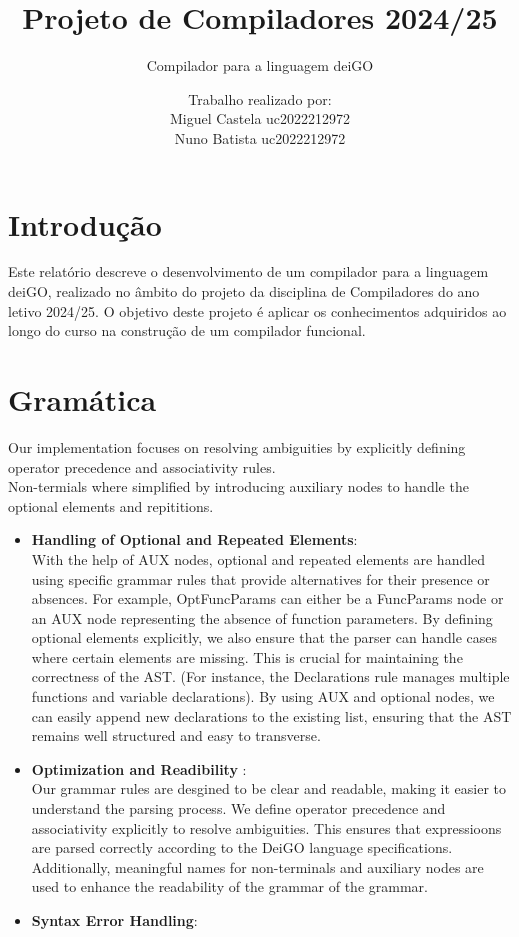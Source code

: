 \documentclass[12pt]{article}
\title{Projeto de Compiladores 2024/25}
\subtitle{Compilador para a linguagem deiGO}
\author{Trabalho realizado por:\\
Miguel Castela uc2022212972 \\
Nuno Batista uc2022212972}
\date{}
\begin{document}
\maketitle

\newpage

\section{Introdução}
Este relatório descreve o desenvolvimento de um compilador para a linguagem deiGO, realizado no âmbito do projeto da disciplina de Compiladores do ano letivo 2024/25. O objetivo deste projeto é aplicar os conhecimentos adquiridos ao longo do curso na construção de um compilador funcional.

\section{Gramática}
Our implementation focuses on resolving ambiguities by explicitly defining operator precedence and associativity rules.\\ Non-termials where simplified by introducing auxiliary nodes to handle the optional elements and repititions.
\begin{itemize}
    \item \textbf{Handling of Optional and Repeated Elements}: \\ With the help of AUX nodes, optional and repeated elements are handled using specific grammar rules that provide alternatives for their presence or absences. For example,
    OptFuncParams can either be a FuncParams node or an AUX node representing the absence of function parameters. By defining optional elements explicitly, we also ensure that the parser can handle cases where certain elements are missing. This is crucial for maintaining the correctness of the AST. (For instance, the Declarations rule manages multiple functions and variable declarations). By using AUX and optional nodes, we can easily append new declarations to the existing list, ensuring that the AST remains well structured and easy to transverse.
    \item \textbf{Optimization and Readibility }: \\ Our grammar rules are desgined to be clear and readable, making it easier to understand the parsing process. We define operator precedence and associativity explicitly to resolve ambiguities. This ensures that expressioons are parsed correctly according to the DeiGO language specifications. Additionally, meaningful names for non-terminals and auxiliary nodes are used to enhance the readability of the grammar of the grammar.
    \item \textbf{Syntax Error Handling}: 
\end{itemize}
\end{document}
